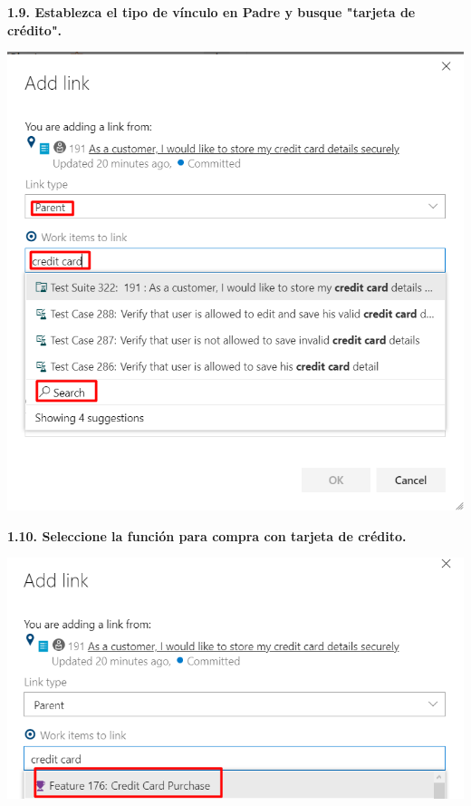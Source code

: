 \documentclass{article}
\begin{document}
\textbf{1.9. Establezca el tipo de vínculo en Padre y busque "tarjeta de crédito".}

    \begin{center}
		\includegraphics[width=14cm]{./images/1.9} 
	\end{center}
	
\newpage
	
\textbf{1.10. 
Seleccione la función para compra con tarjeta de crédito.}

    \begin{center}
		\includegraphics[width=14cm]{./images/1.10} 
	\end{center}

\newpage
	
\end{document}
